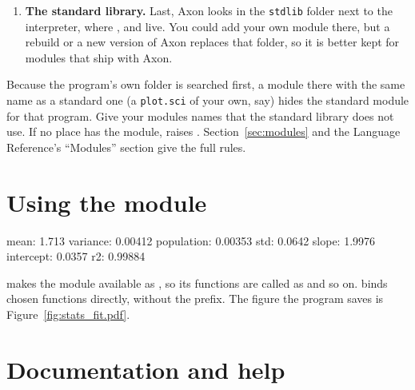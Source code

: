 \documentclass[11pt,a4paper,openany]{report}
\begin{document}
{{\begin{enumerate}
  with \texttt{project/package.toml} containing

\begin{shell}
[dependencies]
mystats = "../shared/mystats"
\end{shell}

   then loads \texttt{shared/mystats/mystats.sci}, the
  folder's main module, and  loads
  \texttt{shared/mystats/extra.sci}. Fix a bug there once and every project
  that lists the folder gets the fix.

\item \textbf{The standard library.} Last, Axon looks in the \texttt{stdlib}
  folder next to the interpreter, where ,  and
   live. You could add your own module there, but a rebuild or a new
  version of Axon replaces that folder, so it is better kept for modules that
  ship with Axon.
\end{enumerate}

Because the program's own folder is searched first, a module there with the
same name as a standard one (a \texttt{plot.sci} of your own, say) hides the
standard module for that program. Give your modules names that the standard
library does not use. If no place has the module,  raises
. Section~\ref{sec:modules} and the Language Reference's
``Modules'' section give the full rules.

\section{Using the module}

\begin{axonout}
mean: 1.713
variance: 0.00412 population: 0.00353
std: 0.0642
slope: 1.9976 intercept: 0.0357 r2: 0.99884
\end{axonout}

 makes the module available as , so its
functions are called as  and so on.
 binds chosen functions directly,
without the prefix. The
figure the program saves is Figure~\ref{fig:stats_fit.pdf}.


\section{Documentation and help}

}}
\end{document}
